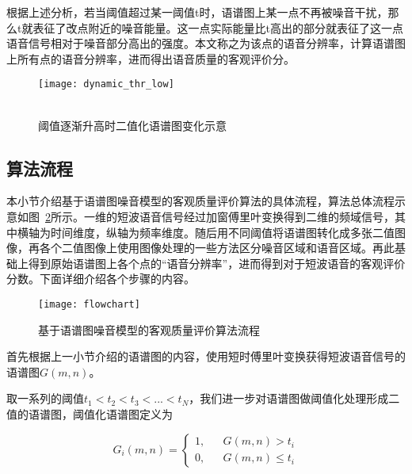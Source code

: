 根据上述分析，若当阈值超过某一阈值t时，语谱图上某一点不再被噪音干扰，那么t就表征了改点附近的噪音能量。这一点实际能量比t高出的部分就表征了这一点语音信号相对于噪音部分高出的强度。本文称之为该点的语音分辨率，计算语谱图上所有点的语音分辨率，进而得出语音质量的客观评价分。

\begin{figure}
\centering
{} {
    \texttt{[image: dynamic\_thr\_low]}
}
\vspace{0.8ex}
\\
\vspace{0.8ex}
\\
\caption{阈值逐渐升高时二值化语谱图变化示意\label{fig:dynamic-thr}}
\end{figure}

\subsection{算法流程}

本小节介绍基于语谱图噪音模型的客观质量评价算法的具体流程，算法总体流程示意如图~\ref{fig:flowchart}所示。一维的短波语音信号经过加窗傅里叶变换得到二维的频域信号，其中横轴为时间维度，纵轴为频率维度。随后用不同阈值将语谱图转化成多张二值图像，再各个二值图像上使用图像处理的一些方法区分噪音区域和语音区域。再此基础上得到原始语谱图上各个点的“语音分辨率”，进而得到对于短波语音的客观评价分数。下面详细介绍各个步骤的内容。

\begin{figure}
\centering
\texttt{[image: flowchart]}
\caption{基于语谱图噪音模型的客观质量评价算法流程\label{fig:flowchart}}
\end{figure}

首先根据上一小节介绍的语谱图的内容，使用短时傅里叶变换获得短波语音信号的语谱图$G(m,n)$。

取一系列的阈值$t_1<t_2<t_3<...<t_N$，我们进一步对语谱图做阈值化处理形成二值的语谱图，阈值化语谱图定义为

\begin{equation}\label{eq:thr_tf}
G_i(m, n) = \left\{
    \begin{array}{rcl}
    1, && {G(m,n)>t_i} \\
    0, && {G(m,n)\leq t_i}
    \end{array} \right.
\end{equation}

